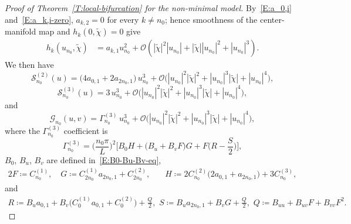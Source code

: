 \documentclass[11pt]{article} %
\theoremstyle{remark}
\theoremstyle{remark}
\numberwithin{equation}{section}
\numberwithin{figure}{section}
\numberwithin{table}{section}
\begin{document}
\begin{proof}[Proof of Theorem~\ref{T:local-bifurcation}  for the non-minimal model]
  By~\eqref{E:a_0,i} and~\eqref{E:a_k,i-zero}, $a_{k,2} = 0$ for every $k \ne
  n_0$; hence smoothness of the center-manifold map and $h_k(0, \widetilde{\chi})
  = 0$ give
  \begin{align}\label{E:hk-expansion}
    h_k(u_{n_0},\widetilde{\chi})
    &=a_{k,1}u_{n_0}^2
    +\mathcal{O}\left(
    |\widetilde{\chi}|^2|u_{n_0}|
    +|\widetilde{\chi}||u_{n_0}|^2
    +|u_{n_0}|^3
    \right).
  \end{align}
  We then have
  \begin{equation}\label{E:S2-center}
    \mathcal{S}^{(2)}_{n_0}(u)
    = \bigl(4a_{0,1} + 2a_{2n_0,1}\bigr)\,u_{n_0}^3
    + \mathcal{O}\Big({|u_{n_0}|^{{2}} |\tilde{\chi}|^2+ {|u_{n_0}|^3}
    |\tilde{\chi}|+ |u_{n_0}|^4}\Big),
  \end{equation}
  \begin{equation}\label{E:S3-center}
    \mathcal{S}^{(3)}_{n_0}(u)
    = 3\,u_{n_0}^3 + \mathcal{O}\Big({ |u_{n_0}|^{{2}} |\tilde{\chi}|^2+
    {|u_{n_0}|^3} |\tilde{\chi}|+ |u_{n_0}|^4}\Big),
  \end{equation}
  and
  \begin{equation}\label{E:Gn0-cubic}
    \mathcal{G}_{n_0}(u,v)
    = \Gamma_{n_0}^{(3)}\,u_{n_0}^3
    + \mathcal{O}\Big({|u_{n_0}|^{{2}} |\tilde{\chi}|^2+ {|u_{n_0}|^3}
    |\tilde{\chi}|+ |u_{n_0}|^4}\Big),
  \end{equation}
  where the $\Gamma_{n_0}^{(3)}$ coefficient is
  \begin{equation}\label{E:Gamma-n0-explicit}
    \Gamma_{n_0}^{(3)} =\Big(\frac{n_0\pi}{L}\Big)^2\Big[
    B_0H+\Big(B_u+B_vF\Big)G +F\Big(R-\frac{S}{2}\Big) \Big],
  \end{equation}
  $B_0$, $B_u$, $B_v$ are defined in~\eqref{E:B0-Bu-Bv-eq},
  \begin{alignat}{2}\label{E:E-F-G-H}
    {  F\coloneqq C_{n_0}^{(1)}, } \quad
    G  \coloneqq C_{2n_0}^{(1)}a_{2n_0,1}+C_{2n_0}^{(2)},   \quad
    & H \coloneqq 2C_{n_0}^{(2)}\Big(2a_{0,1}+a_{2n_0,1}\Big) +3C_{n_0}^{(3)},
  \end{alignat}
  and
  \begin{align*}
    R \coloneqq B_ua_{0,1}+B_v \big(
    C_0^{(1)}a_{0,1}+C_0^{(2)}\big)+\frac{Q}{2}, \,\,
    S \coloneqq B_u a_{2n_0,1}+B_vG+\frac{Q}{2},
    \,\,
    Q \coloneqq B_{uu}+B_{uv}F+B_{vv}F^2.
  \end{align*}


\end{proof}
\end{document}
